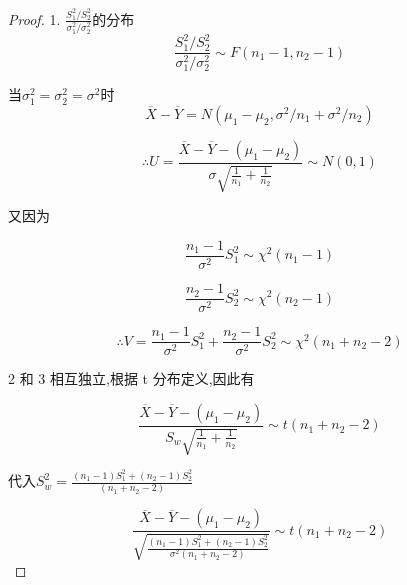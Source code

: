 \begin{proof}

    1. $\frac{S_1^2/S^2_2}{\sigma_1^2 / \sigma_2^2}$的分布
    $$
        {
                \frac{S_1^2/S^2_2}{\sigma_1^2 / \sigma_2^2} \sim F(n_1 - 1, n_2 -1)}
    $$

    当$\sigma^2_1 = \sigma^2_2= \sigma^2$时
    $$
        \overline{X} - \overline{Y} = N(\mu_1-\mu_2, \sigma^2 / n_1 + \sigma^2 /n_2)
    $$

    $$
        \therefore U = \frac{\overline{X} - \overline{Y}- (\mu_1 - \mu_2 )}{\sigma \sqrt{ \frac{1}{n_1} + \frac{1}{n_2} }} \sim N(0,1)
    $$


    又因为

    $$
        \frac{n_1 -1}{\sigma^2}S_1^2 \sim \chi^2(n_1 - 1)
    $$

    $$ \frac{n_2 -1}{\sigma^2}S_2^2 \sim \chi^2(n_2 - 1) $$

    $$
        \therefore
        V=\frac{n_1 -1}{\sigma^2}S_1^2 + \frac{n_2 -1}{\sigma^2}S_2^2 \sim \chi^2(n_1 + n_2 -2)
    $$

    2 和 3 相互独立,根据 t 分布定义,因此有

    $$
        \frac{\overline{X} - \overline{Y}- (\mu_1 - \mu_2 )}{S_w \sqrt{ \frac{1}{n_1} + \frac{1}{n_2} }} \sim t(n_1+n_2-2)
    $$

    代入$S_w^2 = \frac{(n_1 - 1) S_1^2 + (n_2 - 1 ) S_2^2  }{ (n_1+n_2-2)}$

    $$
        \frac{\overline{X} - \overline{Y}- (\mu_1 - \mu_2 )}{\sqrt{ \frac{(n_1 - 1) S_1^2 + (n_2 - 1 ) S_2^2 }{\sigma^2 (n_1+n_2-2)} }} \sim t(n_1+n_2-2)
    $$
\end{proof}